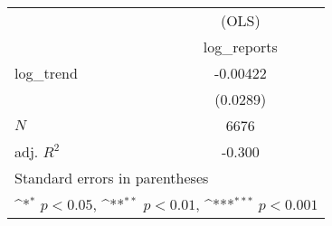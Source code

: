 {
\def\sym#1{\ifmmode^{#1}\else\(^{#1}\)\fi}
\begin{tabular}{l*{1}{c}}
\hline\hline
            &\multicolumn{1}{c}{(OLS)}\\
            &\multicolumn{1}{c}{log\_reports}\\
\hline
log\_trend   &    -0.00422         \\
            &    (0.0289)         \\
\hline
\(N\)       &        6676         \\
adj. \(R^{2}\)&      -0.300         \\
\hline\hline
\multicolumn{2}{l}{\footnotesize Standard errors in parentheses}\\
\multicolumn{2}{l}{\footnotesize \sym{*} \(p<0.05\), \sym{**} \(p<0.01\), \sym{***} \(p<0.001\)}\\
\end{tabular}
}
